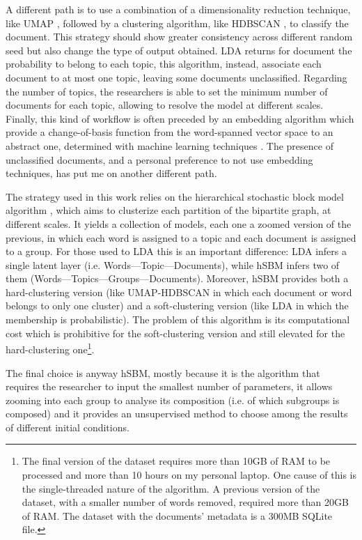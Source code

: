 \documentclass[a4paper, 11pt, headings=standardclasses, tablecaptionsbelow]{scrartcl}
\begin{document}
A different path is to use a combination of a dimensionality reduction technique, like UMAP \parencite{mcinnes2020}, followed by a clustering algorithm, like HDBSCAN \parencite{campello2013,mcinnes2017}, to classify the document. This strategy should show greater consistency across different random seed but also change the type of output obtained. LDA returns for document the probability to belong to each topic, this algorithm, instead, associate each document to at most one topic, leaving some documents unclassified. Regarding the number of topics, the researchers is able to set the minimum number of documents for each topic, allowing to resolve the model at different scales. Finally, this kind of workflow is often preceded by an embedding algorithm which provide a change-of-basis function from the word-spanned vector space to an abstract one, determined with machine learning techniques \parencite{angelov2020,grootendorst2022}.
The presence of unclassified documents, and a personal preference to not use embedding techniques, has put me on another different path.

The strategy used in this work relies on the hierarchical stochastic block model algorithm \parencite[hSBM,][]{peixoto2019,gerlach2018}, which aims to clusterize each partition of the bipartite graph, at different scales. It yields a collection of models, each one a zoomed version of the previous, in which each word is assigned to a topic and each document is assigned to a group. For those used to LDA this is an important difference: LDA infers a single latent layer (i.e. Words---Topic---Documents), while hSBM infers two of them (Words---Topics---Groups---Documents). Moreover, hSBM provides both a hard-clustering version (like UMAP-HDBSCAN in which each document or word belongs to only one cluster) and a soft-clustering version (like LDA in which the membership is probabilistic). The problem of this algorithm is its computational cost which is prohibitive for the soft-clustering version and still elevated for the hard-clustering one\footnote{The final version of the dataset requires more than 10GB of RAM to be processed and more than 10 hours on my personal laptop. One cause of this is the single-threaded nature of the algorithm. A previous version of the dataset, with a smaller number of words removed, required more than 20GB of RAM. The dataset with the documents' metadata is a 300MB SQLite file.}.

The final choice is anyway hSBM, mostly because it is the algorithm that requires the researcher to input the smallest number of parameters, it allows zooming into each group to analyse its composition (i.e. of which subgroups is composed) and it provides an unsupervised method to choose among the results of different initial conditions.
\end{document}
